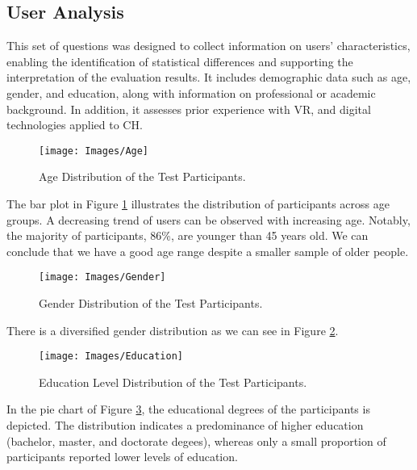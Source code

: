 \subsection{User Analysis}

This set of questions was designed to collect information on users' characteristics, enabling the identification of statistical differences and supporting the interpretation of the evaluation results. 
It includes demographic data such as age, gender, and education, along with information on professional or academic background.
In addition, it assesses prior experience with \gls{VR}, and digital technologies applied to \gls{CH}.

\begin{figure}[h!]
    \centering
    \texttt{[image: Images/Age]}
    \caption{Age Distribution of the Test Participants.} 
    \label{fig:age}
\end{figure}

The bar plot in Figure \ref{fig:age} illustrates the distribution of participants across age groups. A decreasing trend of users can be observed with increasing age. Notably, the majority of participants, 86\%, are younger than 45 years old.
We can conclude that we have a good age range despite a smaller sample of older people.

\begin{figure}[h!]
    \centering
    \texttt{[image: Images/Gender]}
    \caption{Gender Distribution of the Test Participants.} 
    \label{fig:gender}
\end{figure}

There is a diversified gender distribution as we can see in Figure \ref{fig:gender}.

\begin{figure}[h!]
    \centering
    \texttt{[image: Images/Education]}
    \caption{Education Level Distribution of the Test Participants.} 
    \label{fig:education}
\end{figure}

In the pie chart of Figure \ref{fig:education}, the educational degrees of the participants is depicted. 
The distribution indicates a predominance of higher education (bachelor, master, and doctorate degees), whereas only a small proportion of participants reported lower levels of education.


